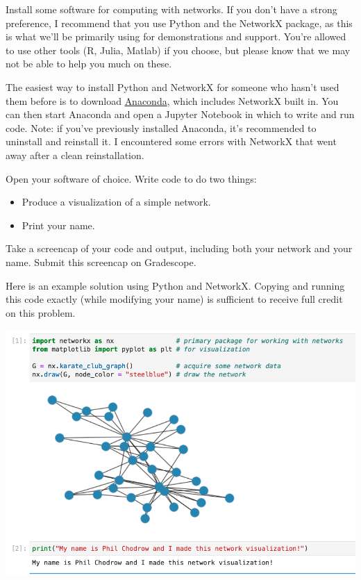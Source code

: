 \documentclass{hw}
\begin{document}

    



\problem{}

Install some software for computing with networks. 
If you don't have a strong preference, I recommend that you use Python and the NetworkX package, as this is what we'll be primarily using for demonstrations and support. 
You're allowed to use other tools (R, Julia, Matlab) if you choose, but please know that we may not be able to help you much on these. 

The easiest way to install Python and NetworkX for someone who hasn't used them before is to download \href{https://www.anaconda.com}{Anaconda}, which includes NetworkX built in. 
You can then start Anaconda and open a Jupyter Notebook in which to write and run code. 
Note: if you've previously installed Anaconda, it's recommended to uninstall and reinstall it. 
I encountered some errors with NetworkX that went away after a clean reinstallation. 

Open your software of choice. Write code to do two things: 
\begin{itemize}
    \item Produce a visualization of a simple network. 
    \item Print your name. 
\end{itemize}
Take a screencap of your code and output, including both your network and your name. 
Submit this screencap on Gradescope. 

Here is an example solution using Python and NetworkX. 
Copying and running this code exactly (while modifying your name) is sufficient to receive full credit on this problem. 

\includegraphics[width=\textwidth]{img/network-viz.png}
\end{document}
